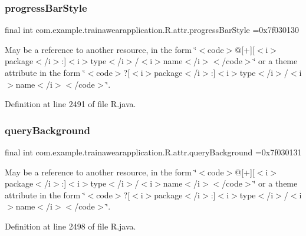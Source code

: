 \subsubsection{\texorpdfstring{progressBarStyle}{progressBarStyle}}
{\footnotesize\ttfamily final int com.\+example.\+trainawearapplication.\+R.\+attr.\+progress\+Bar\+Style =0x7f030130\hspace{0.3cm}{\ttfamily [static]}}

May be a reference to another resource, in the form \char`\"{}$<$code$>$@\mbox{[}+\mbox{]}\mbox{[}$<$i$>$package$<$/i$>$\+:\mbox{]}$<$i$>$type$<$/i$>$/$<$i$>$name$<$/i$>$$<$/code$>$\char`\"{} or a theme attribute in the form \char`\"{}$<$code$>$?\mbox{[}$<$i$>$package$<$/i$>$\+:\mbox{]}$<$i$>$type$<$/i$>$/$<$i$>$name$<$/i$>$$<$/code$>$\char`\"{}. 

Definition at line 2491 of file R.\+java.

\mbox{\label{classcom_1_1example_1_1trainawearapplication_1_1_r_1_1attr_abb6a1dbf6a0c61447239d8af260dd73f}} 
\subsubsection{\texorpdfstring{queryBackground}{queryBackground}}
{\footnotesize\ttfamily final int com.\+example.\+trainawearapplication.\+R.\+attr.\+query\+Background =0x7f030131\hspace{0.3cm}{\ttfamily [static]}}

May be a reference to another resource, in the form \char`\"{}$<$code$>$@\mbox{[}+\mbox{]}\mbox{[}$<$i$>$package$<$/i$>$\+:\mbox{]}$<$i$>$type$<$/i$>$/$<$i$>$name$<$/i$>$$<$/code$>$\char`\"{} or a theme attribute in the form \char`\"{}$<$code$>$?\mbox{[}$<$i$>$package$<$/i$>$\+:\mbox{]}$<$i$>$type$<$/i$>$/$<$i$>$name$<$/i$>$$<$/code$>$\char`\"{}. 

Definition at line 2498 of file R.\+java.

\mbox{\label{classcom_1_1example_1_1trainawearapplication_1_1_r_1_1attr_adca542daf6438502183c28c6bfa6b73f}} 
